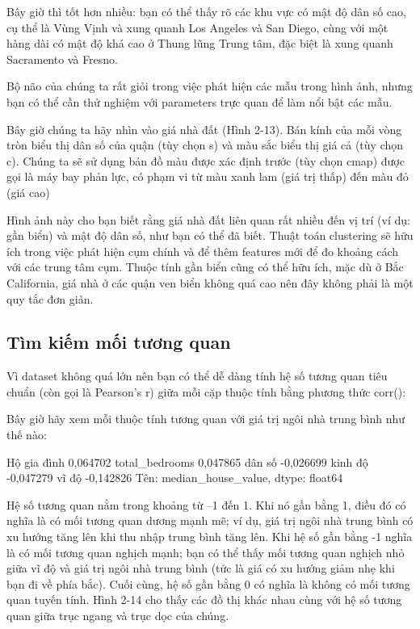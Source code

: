 Bây giờ thì tốt hơn nhiều: bạn có thể thấy rõ các khu vực có mật độ dân số cao, cụ thể là Vùng Vịnh và xung quanh Los Angeles và San Diego, cùng với một hàng dài có mật độ khá cao ở Thung lũng Trung tâm, đặc biệt là xung quanh Sacramento và Fresno.

Bộ não của chúng ta rất giỏi trong việc phát hiện các mẫu trong hình ảnh, nhưng bạn có thể cần thử nghiệm với parameters trực quan để làm nổi bật các mẫu.

Bây giờ chúng ta hãy nhìn vào giá nhà đất (Hình 2-13). Bán kính của mỗi vòng tròn biểu thị dân số của quận (tùy chọn s) và màu sắc biểu thị giá cả (tùy chọn c). Chúng ta sẽ sử dụng bản đồ màu được xác định trước (tùy chọn cmap) được gọi là máy bay phản lực, có phạm vi từ màu xanh lam (giá trị thấp) đến màu đỏ (giá cao)

Hình ảnh này cho bạn biết rằng giá nhà đất liên quan rất nhiều đến vị trí (ví dụ: gần biển) và mật độ dân số, như bạn có thể đã biết. Thuật toán clustering sẽ hữu ích trong việc phát hiện cụm chính và để thêm features mới để đo khoảng cách với các trung tâm cụm. Thuộc tính gần biển cũng có thể hữu ích, mặc dù ở Bắc California, giá nhà ở các quận ven biển không quá cao nên đây không phải là một quy tắc đơn giản.

\subsection{Tìm kiếm mối tương quan}

Vì dataset không quá lớn nên bạn có thể dễ dàng tính hệ số tương quan tiêu chuẩn (còn gọi là Pearson’s r) giữa mỗi cặp thuộc tính bằng phương thức corr():

Bây giờ hãy xem mỗi thuộc tính tương quan với giá trị ngôi nhà trung bình như thế nào:

Hộ gia đình 0,064702 total\_bedrooms 0,047865 dân số -0,026699 kinh độ -0,047279 vĩ độ -0,142826 Tên: median\_house\_value, dtype: float64

Hệ số tương quan nằm trong khoảng từ –1 đến 1. Khi nó gần bằng 1, điều đó có nghĩa là có mối tương quan dương mạnh mẽ; ví dụ, giá trị ngôi nhà trung bình có xu hướng tăng lên khi thu nhập trung bình tăng lên. Khi hệ số gần bằng -1 nghĩa là có mối tương quan nghịch mạnh; bạn có thể thấy mối tương quan nghịch nhỏ giữa vĩ độ và giá trị ngôi nhà trung bình (tức là giá có xu hướng giảm nhẹ khi bạn đi về phía bắc). Cuối cùng, hệ số gần bằng 0 có nghĩa là không có mối tương quan tuyến tính. Hình 2-14 cho thấy các đồ thị khác nhau cùng với hệ số tương quan giữa trục ngang và trục dọc của chúng.

